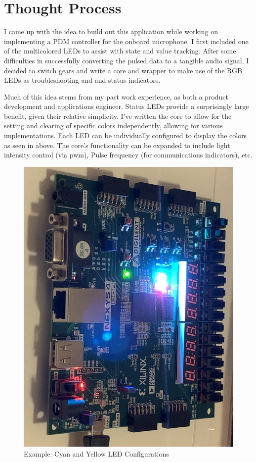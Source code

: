 \documentclass{article}
\begin{document}
\section{Thought Process}
I came up with the idea to build out this application while working on implementing a PDM controller for the onboard microphone. I first included one of the multicolored LEDs to assist with state and value tracking. After some difficulties in successfully converting the pulsed data to a tangible audio signal, I decided to switch gears and write a core and wrapper to make use of the RGB LEDs as troubleshooting and and status indicators. 

Much of this idea stems from my past work experience, as both a product development and applications engineer. Status LEDs provide a surprisingly large benefit, given their relative simplicity. I've written the core to allow for the setting and clearing of specific colors independently, allowing for various implementations. Each LED can be individually configured to display the colors as seen in above. The core's functionality can be expanded to include light intensity control (via pwm), Pulse frequency (for communications indicators), etc.

	\begin{figure}[h!]
		\includegraphics[width=.9\linewidth]{cr.JPG}
		\caption{Example: Cyan and Yellow LED Configurations}
	\end{figure}
\end{document}
